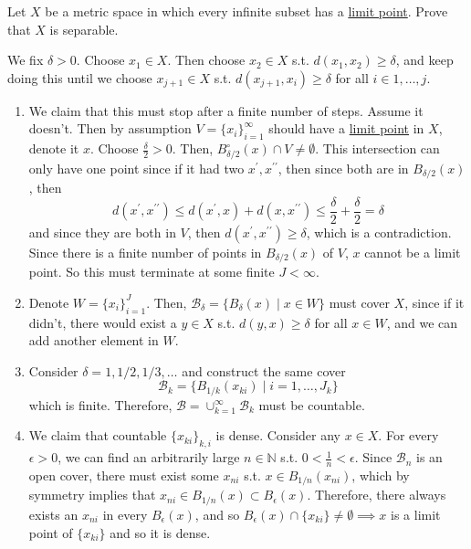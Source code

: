   \begin{exercise}[Rudin 2.24]
    Let $X$ be a metric space in which every infinite subset has a \hyperref[pst-def:limit-point]{limit point}. Prove that $X$ is separable. 
  \end{exercise}
  \begin{solution}
    We fix $\delta > 0$. Choose $x_1 \in X$. Then choose $x_2 \in X$ s.t. $d(x_1, x_2) \geq \delta$, and keep doing this until we choose $x_{j + 1} \in X$ s.t. $d(x_{j+1}, x_i) \geq \delta$ for all $i \in 1, \ldots, j$. 
    \begin{enumerate}
        \item We claim that this must stop after a finite number of steps. Assume it doesn't. Then by assumption $V = \{x_i\}_{i=1}^\infty$ should have a \hyperref[pst-def:limit-point]{limit point} in $X$, denote it $x$. Choose $\frac{\delta}{2} > 0$. Then, $B_{\delta / 2}^\circ (x) \cap V \neq \emptyset$. This intersection can only have one point since if it had two $x^\prime, x^{\prime\prime}$, then since both are in $B_{\delta /2} (x)$, then 
          \begin{equation}
            d(x^\prime, x^{\prime\prime}) \leq d(x^\prime, x) + d(x, x^{\prime\prime}) \leq \frac{\delta}{2} + \frac{\delta}{2} = \delta
          \end{equation}
          and since they are both in $V$, then $d(x^\prime, x^{\prime\prime}) \geq \delta$, which is a contradiction. Since there is a finite number of points in $B_{\delta /2} (x)$ of $V$, $x$ cannot be a limit point. So this must terminate at some finite $J < \infty$. 

        \item Denote $W = \{x_i\}_{i=1}^J$. Then, $\mathscr{B}_\delta = \{B_\delta (x) \mid x \in W\}$ must cover $X$, since if it didn't, there would exist a $y \in X$ s.t. $d(y, x) \geq \delta$ for all $x \in W$, and we can add another element in $W$. 

        \item Consider $\delta = 1, 1/2, 1/3, \ldots$ and construct the same cover 
          \begin{equation}
            \mathscr{B}_k = \{B_{1/k} (x_{ki}) \mid i = 1, \ldots, J_k\}
          \end{equation}
          which is finite. Therefore, $\mathscr{B} = \cup_{k=1}^\infty \mathscr{B}_k$ must be countable. 

        \item We claim that countable $\{x_{ki}\}_{k, i}$ is dense. Consider any $x \in X$. For every $\epsilon > 0$, we can find an arbitrarily large $n \in \mathbb{N}$ s.t. $0 < \frac{1}{n} < \epsilon$. Since $\mathscr{B}_n$ is an open cover, there must exist some $x_{n i}$ s.t. $x \in B_{1/n} (x_{ni})$, which by symmetry implies that $x_{ni} \in B_{1/n} (x) \subset B_\epsilon (x)$. Therefore, there always exists an $x_{ni}$ in every $B_\epsilon (x)$, and so $B_\epsilon (x) \cap \{x_{ki}\} \neq \emptyset \implies x$ is a limit point of $\{x_{ki}\}$ and so it is dense. 
    \end{enumerate}
  \end{solution}


